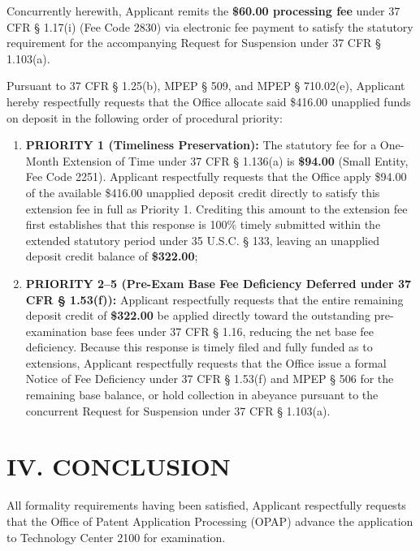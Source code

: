 \documentclass[11pt,letterpaper]{article}
\begin{document}
Concurrently herewith, Applicant remits the \textbf{\$60.00 processing fee} under 37 CFR \S{} 1.17(i) (Fee Code 2830) via electronic fee payment to satisfy the statutory requirement for the accompanying Request for Suspension under 37 CFR \S{} 1.103(a).

Pursuant to 37 CFR \S{} 1.25(b), MPEP \S{} 509, and MPEP \S{} 710.02(e), Applicant hereby respectfully requests that the Office allocate said \$416.00 unapplied funds on deposit in the following order of procedural priority:
\begin{enumerate}[leftmargin=*]
    \item \textbf{PRIORITY 1 (Timeliness Preservation):} The statutory fee for a One-Month Extension of Time under 37 CFR \S{} 1.136(a) is \textbf{\$94.00} (Small Entity, Fee Code 2251). Applicant respectfully requests that the Office apply \$94.00 of the available \$416.00 unapplied deposit credit directly to satisfy this extension fee in full as Priority 1. Crediting this amount to the extension fee first establishes that this response is 100\% timely submitted within the extended statutory period under 35 U.S.C. \S{} 133, leaving an unapplied deposit credit balance of \textbf{\$322.00};
    \item \textbf{PRIORITY 2--5 (Pre-Exam Base Fee Deficiency Deferred under 37 CFR \S{} 1.53(f)):} Applicant respectfully requests that the entire remaining deposit credit of \textbf{\$322.00} be applied directly toward the outstanding pre-examination base fees under 37 CFR \S{} 1.16, reducing the net base fee deficiency. Because this response is timely filed and fully funded as to extensions, Applicant respectfully requests that the Office issue a formal Notice of Fee Deficiency under 37 CFR \S{} 1.53(f) and MPEP \S{} 506 for the remaining base balance, or hold collection in abeyance pursuant to the concurrent Request for Suspension under 37 CFR \S{} 1.103(a).
\end{enumerate}

\section*{IV. CONCLUSION}

All formality requirements having been satisfied, Applicant respectfully requests that the Office of Patent Application Processing (OPAP) advance the application to Technology Center 2100 for examination.
\end{document}
